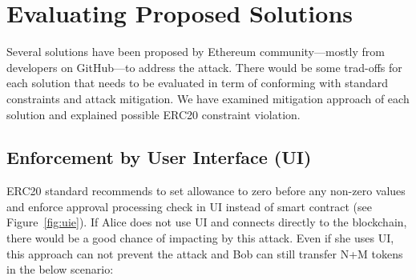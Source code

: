 
\section{Evaluating Proposed Solutions}

Several solutions have been proposed by Ethereum community---mostly from developers on GitHub\cite{Ref07}---to address the attack. There would be some trad-offs for each solution that needs to be evaluated in term of conforming with standard constraints and attack mitigation. We have examined mitigation approach of each solution and explained possible ERC20 constraint violation.

\subsection{Enforcement by User Interface (UI)}


ERC20 standard recommends to set allowance to zero before any non-zero values and enforce approval processing check in UI instead of smart contract (see Figure~\ref{fig:uie}). If Alice does not use UI and connects directly to the blockchain, there would be a good chance of impacting by this attack. Even if she uses UI, this approach can not prevent the attack \cite{Ref14} and Bob can still transfer N+M tokens in the below scenario:


